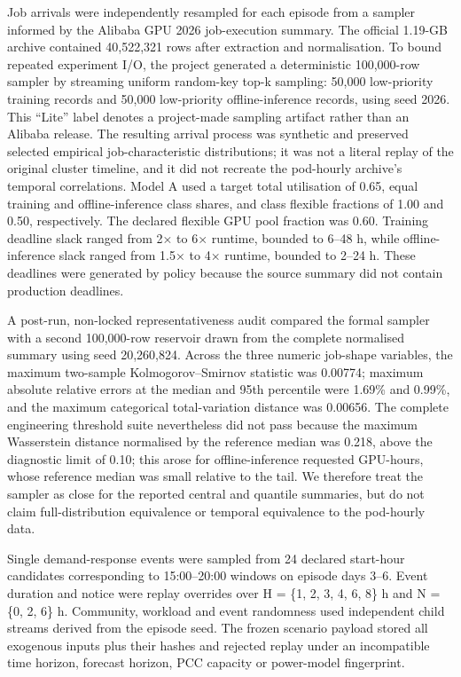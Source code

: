 \documentclass[10pt,a4paper]{article}
\begin{document}
Job arrivals were independently resampled for each episode from a sampler informed by the Alibaba GPU 2026 job-execution summary. The official 1.19-GB archive contained 40,522,321 rows after extraction and normalisation. To bound repeated experiment I/O, the project generated a deterministic 100,000-row sampler by streaming uniform random-key top-k sampling: 50,000 low-priority training records and 50,000 low-priority offline-inference records, using seed 2026. This “Lite” label denotes a project-made sampling artifact rather than an Alibaba release. The resulting arrival process was synthetic and preserved selected empirical job-characteristic distributions; it was not a literal replay of the original cluster timeline, and it did not recreate the pod-hourly archive's temporal correlations. Model A used a target total utilisation of 0.65, equal training and offline-inference class shares, and class flexible fractions of 1.00 and 0.50, respectively. The declared flexible GPU pool fraction was 0.60. Training deadline slack ranged from 2× to 6× runtime, bounded to 6–48 h, while offline-inference slack ranged from 1.5× to 4× runtime, bounded to 2–24 h. These deadlines were generated by policy because the source summary did not contain production deadlines.


A post-run, non-locked representativeness audit compared the formal sampler with a second 100,000-row reservoir drawn from the complete normalised summary using seed 20,260,824. Across the three numeric job-shape variables, the maximum two-sample Kolmogorov–Smirnov statistic was 0.00774; maximum absolute relative errors at the median and 95th percentile were 1.69\% and 0.99\%, and the maximum categorical total-variation distance was 0.00656. The complete engineering threshold suite nevertheless did not pass because the maximum Wasserstein distance normalised by the reference median was 0.218, above the diagnostic limit of 0.10; this arose for offline-inference requested GPU-hours, whose reference median was small relative to the tail. We therefore treat the sampler as close for the reported central and quantile summaries, but do not claim full-distribution equivalence or temporal equivalence to the pod-hourly data.


Single demand-response events were sampled from 24 declared start-hour candidates corresponding to 15:00–20:00 windows on episode days 3–6. Event duration and notice were replay overrides over H = \{1, 2, 3, 4, 6, 8\} h and N = \{0, 2, 6\} h. Community, workload and event randomness used independent child streams derived from the episode seed. The frozen scenario payload stored all exogenous inputs plus their hashes and rejected replay under an incompatible time horizon, forecast horizon, PCC capacity or power-model fingerprint.
\end{document}

